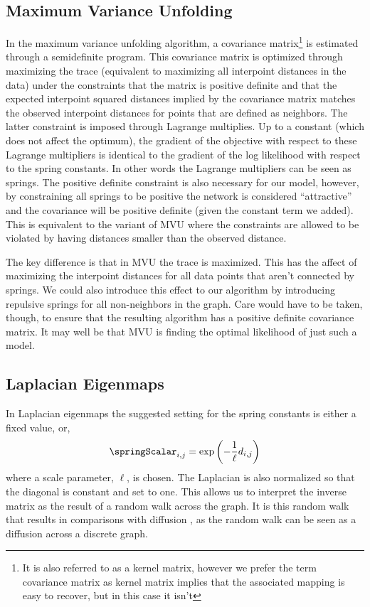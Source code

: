 \subsection{Maximum Variance Unfolding}

In the maximum variance unfolding algorithm, a covariance
matrix\footnote{It is also referred to as a kernel matrix, however we
  prefer the term covariance matrix as kernel matrix implies that the
  associated mapping is easy to recover, but in this case it isn't} is
estimated through a semidefinite program. This covariance matrix is
optimized through maximizing the trace (equivalent to maximizing all
interpoint distances in the data) under the constraints that the
matrix is positive definite and that the expected interpoint squared
distances implied by the covariance matrix matches the observed
interpoint distances for points that are defined as neighbors. The
latter constraint is imposed through Lagrange multiplies. Up to a
constant (which does not affect the optimum), the gradient of the
objective with respect to these Lagrange multipliers is identical to
the gradient of the log likelihood with respect to the spring
constants. In other words the Lagrange multipliers can be seen as
springs. The positive definite constraint is also necessary for our
model, however, by constraining all springs to be positive the network
is considered ``attractive'' and the covariance will be positive
definite (given the constant term we added). This is equivalent to the
variant of MVU where the constraints are allowed to be violated by
having distances smaller than the observed distance.

The key difference is that in MVU the trace is maximized. This has the
affect of maximizing the interpoint distances for all data points that
aren't connected by springs. We could also introduce this effect to
our algorithm by introducing repulsive springs for all non-neighbors
in the graph. Care would have to be taken, though, to ensure that the
resulting algorithm has a positive definite covariance matrix. It may
well be that MVU is finding the optimal likelihood of just such a
model.

\subsection{Laplacian Eigenmaps}

In Laplacian eigenmaps \citep{Belkin:laplacian03} the suggested
setting for the spring constants is either a fixed value, or,
\[
\springScalar_{i,j} = \exp\left(-\frac{1}{\ell} d_{i,j}\right)
\]
where a scale parameter, $\ell$, is chosen. The Laplacian is also
normalized so that the diagonal is constant and set to one. This
allows us to interpret the inverse matrix as the result of a random
walk across the graph. It is this random walk that results in
comparisons with diffusion \citep{Coifman:diffusion06}, as the random
walk can be seen as a diffusion across a discrete graph.

